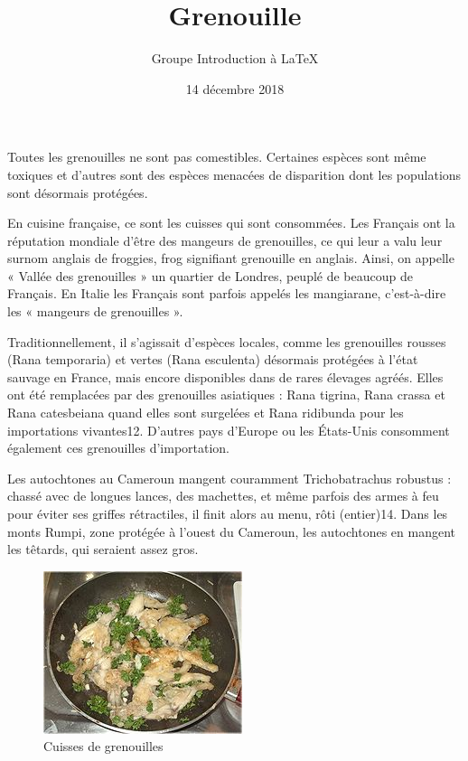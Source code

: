 \documentclass[10pt,a4paper]{article}
\title{Grenouille}
\date {14 décembre 2018}
\author{Groupe Introduction à \LaTeX}
\begin{document}


	\maketitle

	
	
	
	
	

Toutes les grenouilles ne sont pas comestibles. Certaines espèces sont même toxiques et d'autres sont des espèces menacées de disparition dont les populations sont désormais protégées.

En cuisine française, ce sont les cuisses qui sont consommées. Les Français ont la réputation mondiale d'être des mangeurs de grenouilles, ce qui leur a valu leur surnom anglais de froggies, frog signifiant grenouille en anglais. Ainsi, on appelle « Vallée des grenouilles » un quartier de Londres, peuplé de beaucoup de Français.
En Italie les Français sont parfois appelés les mangiarane, c'est-à-dire les « mangeurs de grenouilles ».

Traditionnellement, il s'agissait d'espèces locales, comme les grenouilles rousses (Rana temporaria) et vertes (Rana esculenta) désormais protégées à l'état sauvage en France, mais encore disponibles dans de rares élevages agréés. Elles ont été remplacées par des grenouilles asiatiques : Rana tigrina, Rana crassa et Rana catesbeiana quand elles sont surgelées et Rana ridibunda pour les importations vivantes12. D'autres pays d'Europe ou les États-Unis consomment également ces grenouilles d'importation.

Les autochtones au Cameroun mangent couramment Trichobatrachus robustus : chassé avec de longues lances, des machettes, et même parfois des armes à feu pour éviter ses griffes rétractiles, il finit alors au menu, rôti (entier)14. Dans les monts Rumpi, zone protégée à l'ouest du Cameroun, les autochtones en mangent les têtards, qui seraient assez gros.

	\begin{figure}
		\begin{center}
				\includegraphics[width = .5\textwidth]{cuisine/miam.JPG}
				\caption{Cuisses de grenouilles}
				\label{fig:gre}
		\end{center}
	\end{figure}

				
\end{document}
